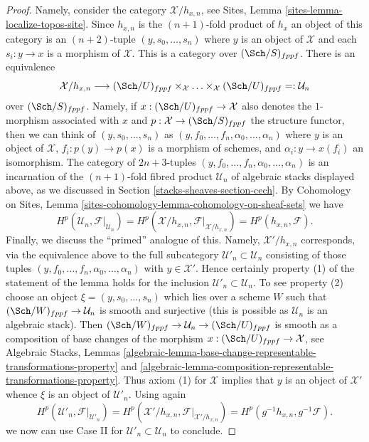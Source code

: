 \begin{proof}
\medskip\noindent
Namely, consider the category $\mathcal{X}/h_{x, n}$, see
Sites, Lemma \ref{sites-lemma-localize-topos-site}.
Since $h_{x, n}$ is the $(n + 1)$-fold product of $h_x$ an
object of this category is an $(n + 2)$-tuple
$(y, s_0, \ldots, s_n)$ where $y$ is an object of $\mathcal{X}$ and each
$s_i : y \to x$ is a morphism of $\mathcal{X}$.
This is a category over $(\Sch/S)_{fppf}$. There is an equivalence
$$
\mathcal{X}/h_{x, n}
\longrightarrow
(\Sch/U)_{fppf} \times_\mathcal{X} \ldots \times_\mathcal{X} (\Sch/U)_{fppf}
=: \mathcal{U}_n
$$
over $(\Sch/S)_{fppf}$. Namely, if $x : (\Sch/U)_{fppf} \to \mathcal{X}$ also
denotes the $1$-morphism associated with $x$ and
$p : \mathcal{X} \to (\Sch/S)_{fppf}$ the structure functor,
then we can think of $(y, s_0, \ldots, s_n)$ as
$(y, f_0, \ldots, f_n, \alpha_0, \ldots, \alpha_n)$
where $y$ is an object of $\mathcal{X}$, $f_i : p(y) \to p(x)$ is a
morphism of schemes, and $\alpha_i : y \to x(f_i)$ an isomorphism.
The category of $2n+3$-tuples
$(y, f_0, \ldots, f_n, \alpha_0, \ldots, \alpha_n)$
is an incarnation of the $(n + 1)$-fold fibred product $\mathcal{U}_n$
of algebraic stacks displayed above, as we discussed in
Section \ref{stacks-sheaves-section-cech}.
By Cohomology on Sites, Lemma
\ref{sites-cohomology-lemma-cohomology-on-sheaf-sets}
we have
$$
H^p(\mathcal{U}_n, \mathcal{F}|_{\mathcal{U}_n}) =
H^p(\mathcal{X}/h_{x, n}, \mathcal{F}|_{\mathcal{X}/h_{x, n}}) =
H^p(h_{x, n}, \mathcal{F}).
$$
Finally, we discuss the ``primed'' analogue of this. Namely,
$\mathcal{X}'/h_{x, n}$ corresponds, via the equivalence above
to the full subcategory $\mathcal{U}'_n \subset \mathcal{U}_n$
consisting of those tuples
$(y, f_0, \ldots, f_n, \alpha_0, \ldots, \alpha_n)$
with $y \in \mathcal{X}'$. Hence certainly property (1) of the
statement of the lemma holds
for the inclusion $\mathcal{U}'_n \subset \mathcal{U}_n$.
To see property (2) choose an object $\xi = (y, s_0, \ldots, s_n)$ which
lies over a scheme $W$ such that $(\Sch/W)_{fppf} \to \mathcal{U}_n$
is smooth and surjective (this is possible as $\mathcal{U}_n$ is
an algebraic stack). Then
$(\Sch/W)_{fppf} \to \mathcal{U}_n \to (\Sch/U)_{fppf}$
is smooth as a composition of base changes of the morphism
$x : (\Sch/U)_{fppf} \to \mathcal{X}$, see
Algebraic Stacks, Lemmas
\ref{algebraic-lemma-base-change-representable-transformations-property} and
\ref{algebraic-lemma-composition-representable-transformations-property}.
Thus axiom (1) for $\mathcal{X}$ implies that $y$ is an object of
$\mathcal{X}'$ whence $\xi$ is an object of $\mathcal{U}'_n$.
Using again
$$
H^p(\mathcal{U}'_n, \mathcal{F}|_{\mathcal{U}'_n}) =
H^p(\mathcal{X}'/h_{x, n}, \mathcal{F}|_{\mathcal{X}'/h_{x, n}}) =
H^p(g^{-1}h_{x, n}, g^{-1}\mathcal{F}).
$$
we now can use Case II for
$\mathcal{U}'_n \subset \mathcal{U}_n$
to conclude.
\end{proof}

